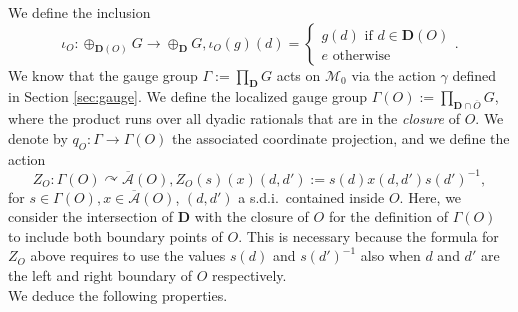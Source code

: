 \documentclass[a4paper,12pt]{amsart}
\numberwithin{equation}{section}
\theoremstyle{definition}
\newcommand{\act}{\curvearrowright}
\newcommand{\oscrA}{{\overline{\mathscr{A}}}}
\newcommand{\D}{\mathbf D}
\newcommand{\ga}{\gamma}
\newcommand{\Ga}{\Gamma}
\newcommand{\scrM}{\mathscr M}
\begin{document}
We define the inclusion 
$$\iota_O:\oplus_{\D(O)} G\to \oplus_\D G, \iota_O(g)(d) = \begin{cases} g(d) \text{ if } d \in \D(O)\\ e \text{ otherwise } \end{cases}.$$
We know that the gauge group $\Ga:=\prod_\D G$ acts on $\scrM_0$ via the action $\ga$ defined in Section \ref{sec:gauge}.
We define the localized gauge group $\Ga(O):=\prod_{\D\cap \overline O} G$, where the product runs over all dyadic rationals that are in the \textit{closure} of $O$.
We denote by $q_O:\Ga\to \Ga(O)$ the associated coordinate projection, and we define the action 
$$Z_O:\Ga(O)\act \oscrA(O), Z_O(s)(x)(d,d'):= s(d) x(d,d') s(d')^{-1},$$ 
for $s\in\Ga(O), x\in\oscrA(O)$, $(d,d')$ a s.d.i.~contained inside $O$.
Here, we consider the intersection of $\D$ with the closure of $O$ for the definition of $\Ga(O)$ to include both boundary points of $O$.
This is necessary because the formula for $Z_O$ above requires to use the values $s(d)$ and $s(d')^{-1}$ also when $d$ and $d'$ are the left and right boundary of $O$ respectively.\\[0.25cm]

We deduce the following properties.
\end{document}
